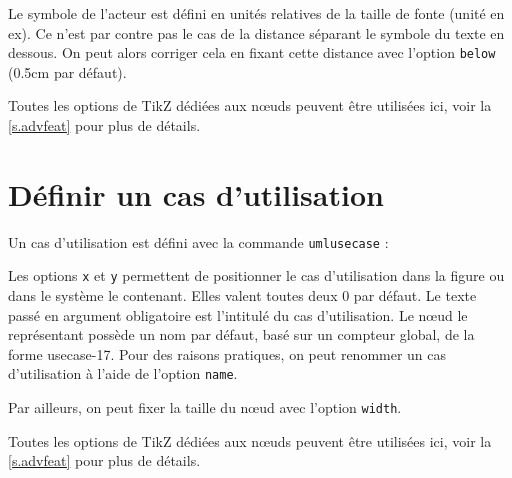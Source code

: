 \documentclass[a4paper,11pt]{report}
\newcommand{\inputTikZ}[1]{%
  }%
\newcommand{\inputTikZ}[1]{%
    \texttt{[image: fig/\#1.pdf]}%
  }%
\newcommand{\TikZ}{{\sc TikZ}}
\begin{document}
\medskip

Le symbole de l'acteur est défini en unités relatives de la taille de fonte (unité en ex). Ce n'est par contre pas le cas de la distance séparant le symbole du texte en dessous. On peut alors corriger cela en fixant cette distance avec l'option {\tt below} (0.5cm par défaut).

\medskip
 
\begin{minipage}{0.5\textwidth}

\end{minipage}
\begin{minipage}{0.5\textwidth}
\begin{center}
\inputTikZ{actorfont}
\end{center}
\end{minipage}

Toutes les options de \TikZ{} dédiées aux n\oe{}uds peuvent être utilisées ici, voir la \autoref{s.advfeat} pour plus de détails.

\section{Définir un cas d'utilisation}\label{s.usecase}

Un cas d'utilisation est défini avec la commande {\tt umlusecase} :

\medskip

\begin{minipage}{0.5\textwidth}

\end{minipage}
\begin{minipage}{0.5\textwidth}
\begin{center}
\inputTikZ{usecase}
\end{center}
\end{minipage}

\medskip

Les options {\tt x} et {\tt y} permettent de positionner le cas d'utilisation dans la figure ou dans le système le contenant. Elles valent toutes deux 0 par défaut. Le texte passé en argument obligatoire est l'intitulé du cas d'utilisation. Le n\oe{}ud le représentant possède un nom par défaut, basé sur un compteur global, de la forme usecase-17. Pour des raisons pratiques, on peut renommer un cas d'utilisation à l'aide de l'option {\tt name}.

Par ailleurs, on peut fixer la taille du n\oe{}ud avec l'option {\tt width}.

Toutes les options de \TikZ{} dédiées aux n\oe{}uds peuvent être utilisées ici, voir la \autoref{s.advfeat} pour plus de détails.
\end{document}
